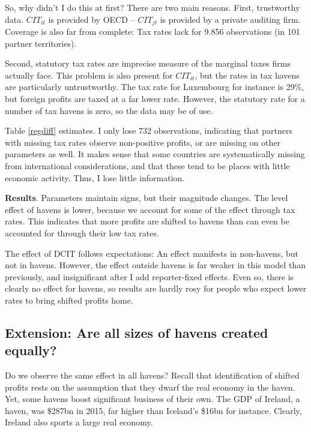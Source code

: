 \documentclass[twoside,a4paper,11pt]{article}
\begin{document}
So, why didn't I do this at first? There are two main reasons. First, trustworthy data. $ CIT_{it} $ is provided by OECD -- $ CIT_{jt} $ is provided by a private auditing firm. Coverage is also far from complete: Tax rates lack for 9.856 observations (in 101 partner territories).

Second, statutory tax rates are imprecise measure of the marginal taxes firms actually face. This problem is also present for $ CIT_{it} $, but the rates in tax havens are particularly untrustworthy. The tax rate for Luxembourg for instance is 29\%, but  foreign profits are taxed at a far lower rate. However, the statutory rate for a number of tax havens is zero, so the data may be of use. 

Table \ref{regdiff} estimates. I only lose 732 observations, indicating that partners with missing tax rates observe non-positive profits, or are missing on other parameters as well. It makes sense that some countries are systematically missing from international considerations, and that these tend to be places with little economic activity. Thus, I lose little information.   

\textbf{Results}. Parameters maintain signs, but their magnitude changes. The level effect of havens is lower, because we account for some of the effect through tax rates. This indicates that more profits are shifted to havens than can even be accounted for through their low tax rates.

The effect of DCIT follows expectations: An effect manifests in non-havens, but not in havens. However, the effect outside havens is far weaker in this model than previously, and insignificant after I add reporter-fixed effects. Even so, there is clearly no effect for havens, so results are hardly rosy for people who expect lower rates to bring shifted profits home. 

\subsection{Extension: Are all sizes of havens created equally?}
Do we observe the same effect in all havens? Recall that identification of shifted profits rests on the assumption that they dwarf the real economy in the haven. Yet, some havens boost significant business of their own. The GDP of Ireland, a haven, was \$287bn in 2015, far higher than Iceland's \$16bn for instance. Clearly, Ireland also sports a large real economy. 
\end{document}
